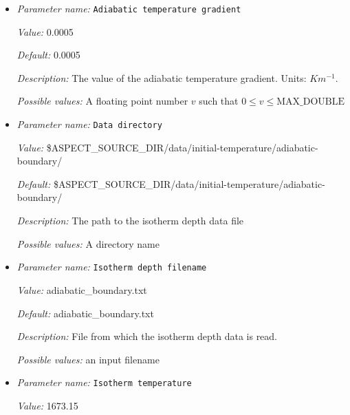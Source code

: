 \begin{itemize}
\item {\it Parameter name:} {\tt Adiabatic temperature gradient}
\label{parameters:Initial temperature model/Adiabatic boundary/Adiabatic temperature gradient}


{\it Value:} 0.0005


{\it Default:} 0.0005


{\it Description:} The value of the adiabatic temperature gradient. Units: $K m^{-1}$.


{\it Possible values:} A floating point number $v$ such that $0 \leq v \leq \text{MAX\_DOUBLE}$
\item {\it Parameter name:} {\tt Data directory}
\label{parameters:Initial temperature model/Adiabatic boundary/Data directory}


{\it Value:} \$ASPECT\_SOURCE\_DIR/data/initial-temperature/adiabatic-boundary/


{\it Default:} \$ASPECT\_SOURCE\_DIR/data/initial-temperature/adiabatic-boundary/


{\it Description:} The path to the isotherm depth data file


{\it Possible values:} A directory name
\item {\it Parameter name:} {\tt Isotherm depth filename}
\label{parameters:Initial temperature model/Adiabatic boundary/Isotherm depth filename}


{\it Value:} adiabatic\_boundary.txt


{\it Default:} adiabatic\_boundary.txt


{\it Description:} File from which the isotherm depth data is read.


{\it Possible values:} an input filename
\item {\it Parameter name:} {\tt Isotherm temperature}
\label{parameters:Initial temperature model/Adiabatic boundary/Isotherm temperature}


{\it Value:} 1673.15



\end{itemize}

